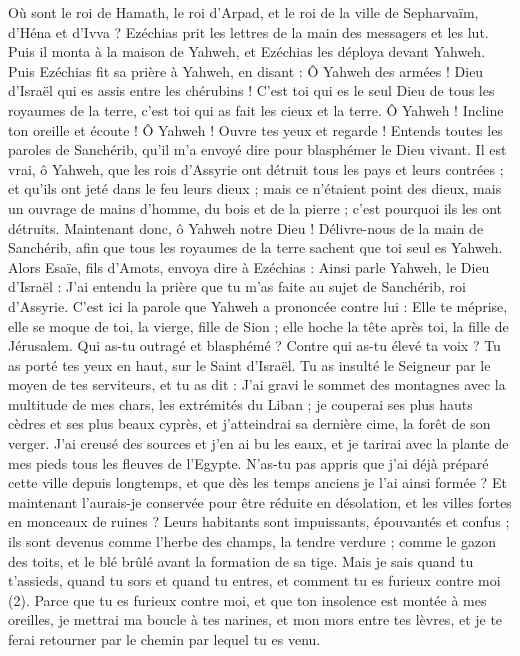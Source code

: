 \begin{multicols}{2}
Où sont le roi de Hamath, le roi d'Arpad, et le roi de la ville de Sepharvaïm, d’Héna et d’Ivva ?
Ezéchias prit les lettres de la main des messagers et les lut. Puis il monta à la maison de Yahweh, et Ezéchias les déploya devant Yahweh.
Puis Ezéchias fit sa prière à Yahweh, en disant :
Ô Yahweh des armées ! Dieu d'Israël qui es assis entre les chérubins ! C’est toi qui es le seul Dieu de tous les royaumes de la terre, c’est toi qui as fait les cieux et la terre.
Ô Yahweh ! Incline ton oreille et écoute ! Ô Yahweh ! Ouvre tes yeux et regarde ! Entends toutes les paroles de Sanchérib, qu’il m'a envoyé dire pour blasphémer le Dieu vivant.
Il est vrai, ô Yahweh, que les rois d’Assyrie ont détruit tous les pays et leurs contrées ;
et qu'ils ont jeté dans le feu leurs dieux ; mais ce n'étaient point des dieux, mais un ouvrage de mains d'homme, du bois et de la pierre ; c'est pourquoi ils les ont détruits.
Maintenant donc, ô Yahweh notre Dieu ! Délivre-nous de la main de Sanchérib, afin que tous les royaumes de la terre sachent que toi seul es Yahweh.
Alors Esaïe, fils d'Amots, envoya dire à Ezéchias : Ainsi parle Yahweh, le Dieu d'Israël : J’ai entendu la prière que tu m’as faite au sujet de Sanchérib, roi d’Assyrie.
C'est ici la parole que Yahweh a prononcée contre lui : Elle te méprise, elle se moque de toi, la vierge, fille de Sion ; elle hoche la tête après toi, la fille de Jérusalem.
Qui as-tu outragé et blasphémé ? Contre qui as-tu élevé ta voix ? Tu as porté tes yeux en haut, sur le Saint d'Israël.
Tu as insulté le Seigneur par le moyen de tes serviteurs, et tu as dit : J’ai gravi le sommet des montagnes avec la multitude de mes chars, les extrémités du Liban ; je couperai ses plus hauts cèdres et ses plus beaux cyprès, et j’atteindrai sa dernière cime, la forêt de son verger.
J'ai creusé des sources et j'en ai bu les eaux, et je tarirai avec la plante de mes pieds tous les fleuves de l’Egypte.
N'as-tu pas appris que j’ai déjà préparé cette ville depuis longtemps, et que dès les temps anciens je l'ai ainsi formée ? Et maintenant l'aurais-je conservée pour être réduite en désolation, et les villes fortes en monceaux de ruines ?
Leurs habitants sont impuissants, épouvantés et confus ; ils sont devenus comme l'herbe des champs, la tendre verdure ; comme le gazon des toits, et le blé brûlé avant la formation de sa tige.
Mais je sais quand tu t’assieds, quand tu sors et quand tu entres, et comment tu es furieux contre moi (2).
Parce que tu es furieux contre moi, et que ton insolence est montée à mes oreilles, je mettrai ma boucle à tes narines, et mon mors entre tes lèvres, et je te ferai retourner par le chemin par lequel tu es venu.

\end{multicols}
